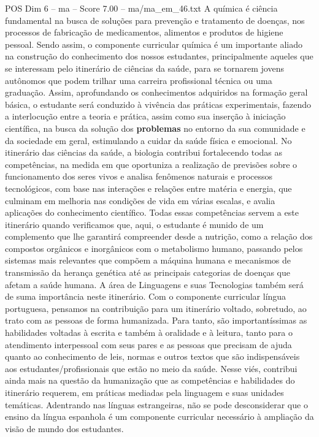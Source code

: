 \begin{textsample}{POS Dim 6 – ma – Score 7.00 – ma/ma\_em\_46.txt}
A química é ciência fundamental na busca de soluções para prevenção e tratamento de doenças, nos processos de fabricação de medicamentos, alimentos e produtos de higiene pessoal.
Sendo assim, o componente curricular química é um importante aliado na construção do conhecimento dos nossos estudantes, principalmente aqueles que se interessam pelo itinerário de ciências da saúde, para se tornarem jovens autônomos que podem trilhar uma carreira profissional técnica ou uma graduação.
Assim, aprofundando os conhecimentos adquiridos na formação geral básica, o estudante será conduzido à vivência das práticas experimentais, fazendo a interlocução entre a teoria e prática, assim como sua inserção à iniciação científica, na busca da solução dos \textbf{problemas} no entorno da sua comunidade e da sociedade em geral, estimulando a cuidar da saúde física e emocional.
No itinerário das ciências da saúde, a biologia contribui fortalecendo todas as competências, na medida em que oportuniza a realização de previsões sobre o funcionamento dos seres vivos e analisa fenômenos naturais e processos tecnológicos, com base nas interações e relações entre matéria e energia, que culminam em melhoria nas condições de vida em várias escalas, e avalia aplicações do conhecimento científico.
Todas essas competências servem a este itinerário quando verificamos que, aqui, o estudante é munido de um complemento que lhe garantirá compreender desde a nutrição, como a relação dos compostos orgânicos e inorgânicos com o metabolismo humano, passando pelos sistemas mais relevantes que compõem a máquina humana e mecanismos de transmissão da herança genética até as principais categorias de doenças que afetam a saúde humana.
A área de Linguagens e suas Tecnologias também será de suma importância neste itinerário.
Com o componente curricular língua portuguesa, pensamos na contribuição para um itinerário voltado, sobretudo, ao trato com as pessoas de forma humanizada.
Para tanto, são importantíssimas as habilidades voltadas à escrita e também à oralidade e à leitura, tanto para o atendimento interpessoal com seus pares e as pessoas que precisam de ajuda quanto ao conhecimento de leis, normas e outros textos que são indispensáveis aos estudantes/profissionais que estão no meio da saúde.
Nesse viés, contribui ainda mais na questão da humanização que as competências e habilidades do itinerário requerem, em práticas mediadas pela linguagem e suas unidades temáticas.
Adentrando nas línguas estrangeiras, não se pode desconsiderar que o ensino da língua espanhola é um componente curricular necessário à ampliação da visão de mundo dos estudantes.

\end{textsample}
